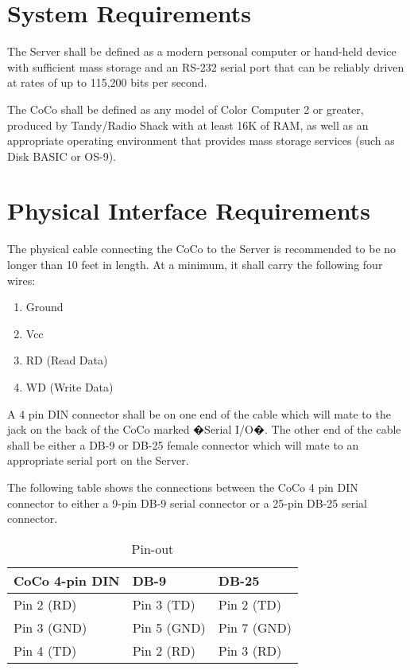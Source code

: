 \documentclass{article}
\begin{document}
\section{System Requirements}

The Server shall be defined as a modern personal computer or hand-held device with sufficient mass storage and an RS-232 serial port that can be reliably driven at rates of up to 115,200 bits per second.

The CoCo shall be defined as any model of Color Computer 2 or greater, produced by Tandy/Radio Shack with at least 16K of RAM, as well as an appropriate operating environment that provides mass storage services (such as Disk BASIC or OS-9).

\section{Physical Interface Requirements}

The physical cable connecting the CoCo to the Server is recommended to be no longer than 10 feet in length. At a minimum, it shall carry the following four wires:
\begin{enumerate}
\item Ground
\item Vcc
\item RD (Read Data)
\item WD (Write Data)
\end{enumerate}
A 4 pin DIN connector shall be on one end of the cable which will mate to the jack on the back of the CoCo marked �Serial I/O�.	The other end of the cable shall be either a DB-9 or DB-25 female connector which will mate to an appropriate serial port on the Server.


The following table shows the connections between the CoCo 4 pin DIN connector to either a 9-pin DB-9 serial connector or a 25-pin DB-25 serial connector.

\begin{table}[ht]
\caption{Pin-out}
\begin{center}
\begin{tabular}{|lll|}
\hline
CoCo 4-pin DIN & DB-9 & DB-25 \\ \hline
Pin 2 (RD) & Pin 3 (TD) & Pin 2 (TD) \\
Pin 3 (GND) & Pin 5 (GND) & Pin 7 (GND) \\
Pin 4 (TD) & Pin 2 (RD) & Pin 3 (RD) \\
\hline
\end{tabular}
\end{center}
\end{table}
\end{document}
